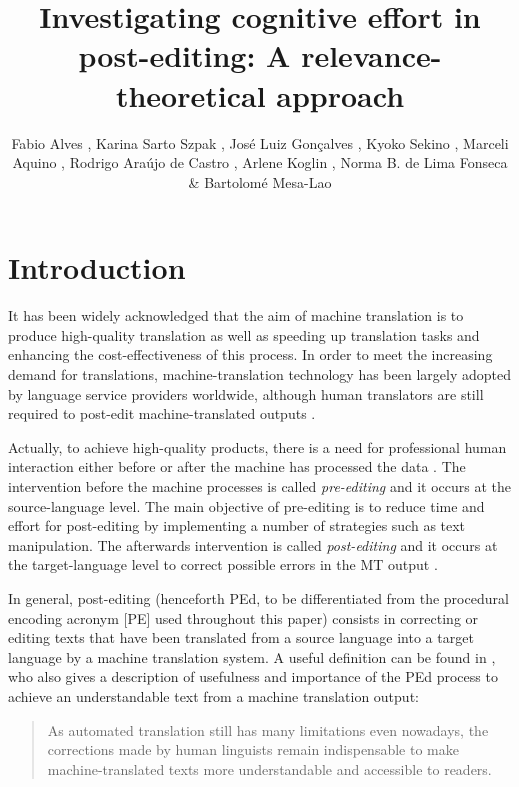 \documentclass[output=paper]{langsci/langscibook}
\author{%
Fabio Alves{\ufmg}%
,
Karina Sarto Szpak{\ufmg}%
,
José Luiz Gonçalves{\ufop}%
,
Kyoko Sekino{\ufmg}%
,
Marceli Aquino{\ufmg}%
,
Rodrigo Araújo de Castro{\ufmg}%
,
Arlene Koglin{\ufmg}%
,
Norma B. de Lima Fonseca{\ufmg}%
 \&
Bartolomé Mesa-Lao{\cbs}
\affiliation{{\ufmg}Universidade Federal de Minas Gerais,  {\ufop}Universidade Federal de Ouro Preto \\{\cbs}Copenhagen Business School}%
}
\title{Investigating cognitive effort in post-editing: {A} relevance-theoretical approach}
\begin{document}
\section{Introduction}

It has been widely acknowledged that the aim of machine translation is to produce high-quality translation as well as speeding up translation tasks and enhancing the cost-effectiveness of this process. In order to meet the increasing demand for translations, machine-translation technology has been largely adopted by language service providers worldwide, although human translators are still required to post-edit machine-translated outputs \citep[p. 17]{almeida2013}. 


Actually, to achieve high-quality products, there is a need for professional human interaction either before or after the machine has processed the data \citep[p. 3]{obrien2004}. The intervention before the machine processes is called \textit{pre-editing} and it occurs at the source-language level. The main objective of pre-editing is to reduce time and effort for post-editing by implementing a number of strategies such as text manipulation. The afterwards intervention is called \textit{post-editing} and it occurs at the target-language level to correct possible errors in the MT output \citep{MesaLao2013}. 



In general, post-editing (henceforth PEd, to be differentiated from the procedural encoding acronym [PE] used throughout this paper) consists in correcting or editing texts that have been translated from a source language into a target language by a machine translation system. A useful definition can be found in \citet{Somers2001}, who also gives a description of usefulness and importance of the PEd process to achieve an understandable text from a machine translation output: 


\begin{quote}
As automated translation still has many limitations even nowadays, the corrections made by human linguists remain indispensable to make machine-translated texts more understandable and accessible to readers. \citep[p. 138]{Somers2001}
\end{quote}
\end{document}
